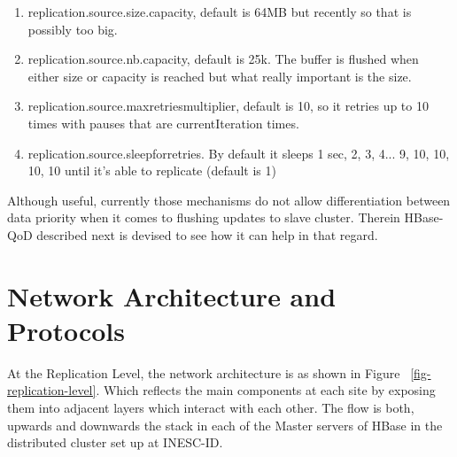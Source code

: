 \begin{enumerate}
\item replication.source.size.capacity, default is 64MB but recently so that is possibly too big.
\item replication.source.nb.capacity, default is 25k. The buffer is flushed when either size or capacity is reached but what really important is the size.
\item replication.source.maxretriesmultiplier, default is 10, so it retries up to 10 times with pauses that are currentIteration times.
\item replication.source.sleepforretries. By default it sleeps 1 sec, 2, 3, 4... 9, 10, 10, 10, 10 until it's able to replicate (default is 1)
\end{enumerate}

Although useful, currently those mechanisms do not allow differentiation between data priority when it comes to flushing updates to slave cluster. Therein HBase-QoD described next is devised to see how it can help in that regard.







\section{Network Architecture and Protocols}\label{architecture:network}
At the Replication Level, the network architecture is as shown in Figure ~\ref{fig-replication-level}. Which reflects the main components at each site by exposing them into adjacent layers which interact with each other. The flow is both, upwards and downwards the stack in each of the Master servers of HBase in the distributed cluster set up at INESC-ID.

